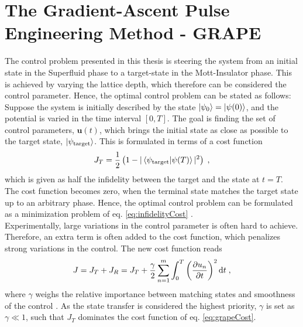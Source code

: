 \section{The Gradient-Ascent Pulse Engineering Method - GRAPE}
The control problem presented in this thesis is steering the system from an initial state in the Superfluid phase to a target-state in the Mott-Insulator phase. This is achieved by varying the lattice depth, which therefore can be considered the control parameter. Hence, the optimal control problem can be stated as follows: 
Suppose the system is initially described by the state $\ket{\psi_0} = \ket{\psi (0)}$, and the potential is varied in the time interval $[ 0 , T]$. The goal is finding the set of control parameters, $\boldsymbol{u}(t)$, which brings the initial state as close as possible to the target state, $\ket{\psi_{\mathrm{target}}}$. This is formulated in terms of a cost function
\begin{equation}
	J_T = \frac{1}{2} \left( 1-|\braket{\psi_{\mathrm{target}} | \psi (T)}|^2 \right) \; ,
	\label{eq:infidelityCost}
\end{equation}
which is given as half the infidelity between the target and the state at $t=T$. The cost function becomes zero, when the terminal state matches the target state up to an arbitrary phase. Hence, the optimal control problem can be formulated as a minimization problem of eq. \eqref{eq:infidelityCost} \cite{Jager2014}.\\
Experimentally, large variations in the control parameter is often hard to achieve. Therefore, an extra term is often added to the cost function, which penalizes strong variations in the control. The new cost function reads
\begin{equation}
	J = J_T + J_R = J_T + \frac{\gamma}{2} \sum_{n=1}^{m} \int_{0}^{T} \left( \pdv{u_n}{t} \right)^2 \mathrm{d}t \; ,
	\label{eq:grapeCost}
\end{equation}
where $\gamma$ weighs the relative importance between matching states and smoothness of the control \cite{Jager2014}. As the state transfer is considered the highest priority, $\gamma$ is set as $\gamma \ll 1$, such that $J_T$ dominates the cost function of eq. \eqref{eq:grapeCost}.\\


